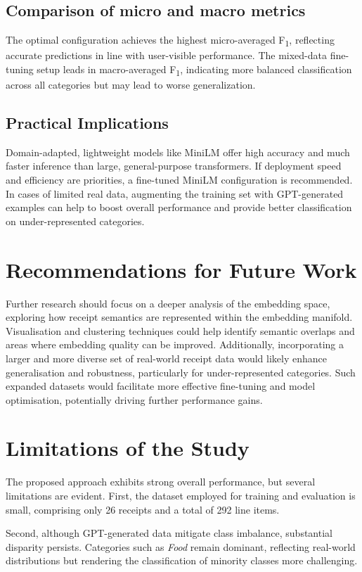 \documentclass{SGGW-thesis-EN}
\begin{document}
\subsection{Comparison of micro and macro metrics}
The optimal configuration achieves the highest micro-averaged F\textsubscript{1}, reflecting accurate predictions in line
with user-visible performance. The mixed-data fine-tuning setup leads in macro-averaged F\textsubscript{1}, indicating
more balanced classification across all categories but may lead to worse generalization.

\subsection{Practical Implications}
Domain-adapted, lightweight models like MiniLM offer high accuracy and much faster inference than large, general-purpose
transformers. If deployment speed and efficiency are priorities, a fine-tuned MiniLM configuration is recommended. In cases
of limited real data, augmenting the training set with GPT-generated examples can help to boost overall performance and provide better classification on under-represented categories.

\section{Recommendations for Future Work}
Further research should focus on a deeper analysis of the embedding space, exploring how receipt semantics are
represented within the embedding manifold. Visualisation and clustering techniques could help identify semantic
overlaps and areas where embedding quality can be improved. Additionally, incorporating a larger and more diverse set
of real-world receipt data would likely enhance generalisation and robustness, particularly for under-represented
categories. Such expanded datasets would facilitate more effective fine-tuning and model optimisation, potentially
driving further performance gains.


\section{Limitations of the Study}
The proposed approach exhibits strong overall performance, but several limitations are evident. First, the dataset
employed for training and evaluation is small, comprising only 26 receipts and a total of 292 line items.

Second, although GPT-generated data mitigate class imbalance, substantial disparity persists. Categories such as
\emph{Food} remain dominant, reflecting real-world distributions but rendering the classification of minority classes
more challenging.
\end{document}
